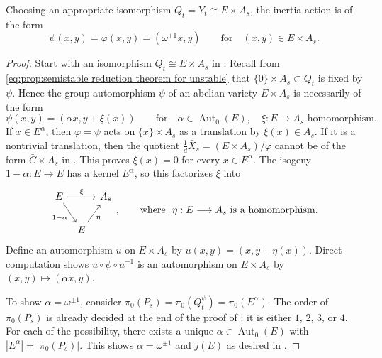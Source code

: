 \documentclass[reqno, letterpaper]{amsart}
\numberwithin{equation}{subsection}
\let\to\longrightarrow
\let\mapsto\longmapsto
\DeclareMathOperator{\Aut}{Aut}
\begin{document}
			\begin{lemma} \label{lem:semistable reduction theorem:varphi}
				Choosing an appropriate isomorphism $Q_t = Y_t \cong E \times A_s$, the inertia action is of the form
				\[ \psi(x,y) = \varphi (x,y) = (\omega^{\pm1} x, y) \qquad\mbox{for}\quad (x,y) \in E \times A_s .\]
			\end{lemma}
			\begin{proof}
				Start with an isomorphism $Q_t \cong E \times A_s$ in . Recall from \eqref{eq:prop:semistable reduction theorem for unstable} that $\{ 0 \} \times A_s \subset Q_t$ is fixed by $\psi$. Hence the group automorphism $\psi$ of an abelian variety $E \times A_s$ is necessarily of the form
				\[ \psi(x,y) = (\alpha x, y + \xi(x)) \qquad\mbox{for}\quad \alpha \in \Aut_0(E) ,\quad \xi : E \to A_s \mbox{ homomorphism} .\]
				If $x \in E^\alpha$, then $\varphi = \psi$ acts on $\{ x \} \times A_s$ as a translation by $\xi(x) \in A_s$. If it is a nontrivial translation, then the quotient $\frac{1}{d} \bar X_s = (E \times A_s)/\varphi$ cannot be of the form $\bar C \times A_s$ in . This proves $\xi(x) = 0$ for every $x \in E^\alpha$. The isogeny $1 - \alpha : E \to E$ has a kernel $E^\alpha$, so this factorizes $\xi$ into
				\[\begin{tikzcd}[column sep=tiny]
					E \arrow[rr, "\xi"] \arrow[rd, "1-\alpha"'] & & A_s \\
					& E \arrow[ru, "\eta"']
				\end{tikzcd}, \qquad\mbox{where } \ \eta : E \to A_s \mbox{ is a homomorphism} .\]
				Define an automorphism $u$ on $E \times A_s$ by $u(x,y) = (x, y + \eta(x))$. Direct computation shows $u \circ \psi \circ u^{-1}$ is an automorphism on $E \times A_s$ by $(x,y) \mapsto (\alpha x, y)$.
				
				To show $\alpha = \omega^{\pm1}$, consider $\pi_0(P_s) = \pi_0(Q_t^\psi) = \pi_0 (E^\alpha)$. The order of $\pi_0(P_s)$ is already decided at the end of the proof of : it is either $1$, $2$, $3$, or $4$. For each of the possibility, there exists a unique $\alpha \in \Aut_0(E)$ with $|E^\alpha| = |\pi_0(P_s)|$. This shows $\alpha = \omega^{\pm1}$ and $j(E)$ as desired in .
			\end{proof}
			
\end{document}
